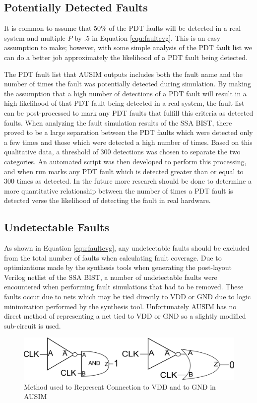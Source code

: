 \documentclass[12pt]{report}
\begin{document}
\subsection{Potentially Detected Faults}
It is common to assume that 50\% of the PDT faults will be detected in a real system and multiple $P$ by $.5$ in Equation \ref{equ:faultcvg}.  This is an easy assumption to make; however, with some simple analysis of the PDT fault list we can do a better job approximately the likelihood of a PDT fault being detected.  

The PDT fault list that AUSIM outputs includes both the fault name and the number of times the fault was potentially detected during simulation.  By making the assumption that a high number of detections of a PDT fault will result in a high likelihood of that PDT fault being detected in a real system, the fault list can be post-processed to mark any PDT faults that fulfill this criteria as detected faults.  When analyzing the fault simulation results of the SSA BIST, there proved to be a large separation between the PDT faults which were detected only a few times and those which were detected a high number of times.  Based on this qualitative data, a threshold of 300 detections was chosen to separate the two categories.  An automated script was then developed to perform this processing, and when run marks any PDT fault which is detected greater than or equal to 300 times as detected.  In the future more research should be done to determine a more quantitative relationship between the number of times a PDT fault is detected verse the likelihood of detecting the fault in real hardware.

\subsection{Undetectable Faults}
As shown in Equation \ref{equ:faultcvg}, any undetectable faults should be excluded from the total number of faults when calculating fault coverage.  Due to optimizations made by the synthesis tools when generating the post-layout Verilog netlist of the SSA BIST, a number of undetectable faults were encountered when performing fault simulations that had to be removed.  These faults occur due to nets which may be tied directly to VDD or GND due to logic minimization performed by the synthesis tool.  Unfortunately AUSIM has no direct method of representing a net tied to VDD or GND so a slightly modified sub-circuit is used.  
\begin{figure}
  \begin{center}
		\includegraphics[scale=.9]{images/vdd-gnd}
  \end{center}
  \caption{Method used to Represent Connection to VDD and to GND in AUSIM}
  \label{fig:ausim_undetectable}
\end{figure}
\end{document}
